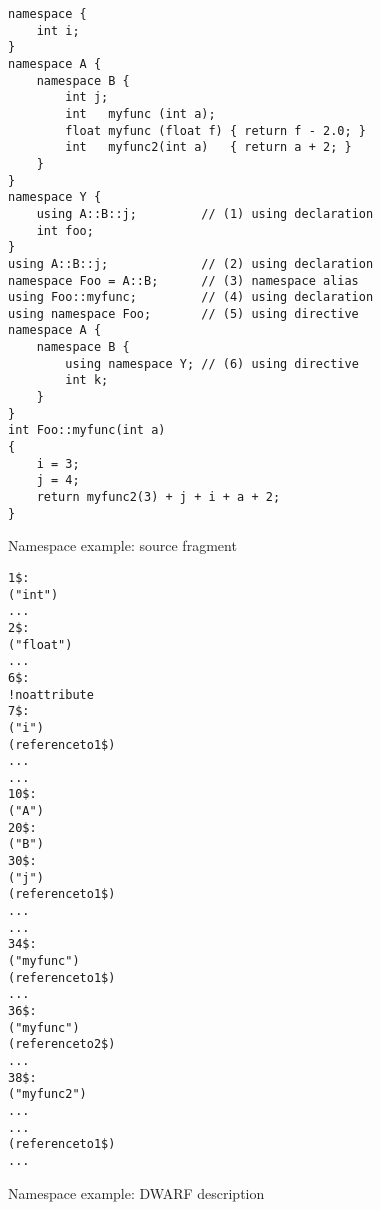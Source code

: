 \begin{figure}[h]
\begin{lstlisting}
namespace {
    int i;
}
namespace A {
    namespace B {
        int j;
        int   myfunc (int a);
        float myfunc (float f) { return f - 2.0; }
        int   myfunc2(int a)   { return a + 2; }
    }
}
namespace Y {
    using A::B::j;         // (1) using declaration
    int foo;
}
using A::B::j;             // (2) using declaration
namespace Foo = A::B;      // (3) namespace alias
using Foo::myfunc;         // (4) using declaration
using namespace Foo;       // (5) using directive
namespace A {
    namespace B {
        using namespace Y; // (6) using directive
        int k;
    }
}
int Foo::myfunc(int a)
{
    i = 3;
    j = 4;
    return myfunc2(3) + j + i + a + 2;
}
\end{lstlisting}
\caption{Namespace example: source fragment}
\label{fig:namespaceexamplesourcefragment}
\end{figure}


\begin{figure}[p]
\begin{dwflisting}
\begin{alltt}

1\$:  \DWTAGbasetype
        \DWATname("int")
        ...
2\$:  \DWTAGbasetype
        \DWATname("float")
        ...
6\$:  \DWTAGnamespace
        ! no \DWATname attribute
7\$:
        \DWTAGvariable
            \DWATname("i")
            \DWATtype(reference to 1\$)
            \DWATlocation ...
            ...
10\$: \DWTAGnamespace
        \DWATname("A")
20\$:    \DWTAGnamespace
            \DWATname("B")
30\$:        \DWTAGvariable
                \DWATname("j")
                \DWATtype(reference to 1\$)
                \DWATlocation ...
                ...
34\$:        \DWTAGsubprogram
                \DWATname("myfunc")
                \DWATtype(reference to 1\$)
                ...
36\$:        \DWTAGsubprogram
                \DWATname("myfunc")
                \DWATtype(reference to 2\$)
                ...
38\$:        \DWTAGsubprogram
                \DWATname("myfunc2")
                \DWATlowpc ...
                \DWAThighpc ...
                \DWATtype(reference to 1\$)
                ...
\end{alltt}
\end{dwflisting}
\caption{Namespace example: DWARF description}
\label{fig:namespaceexampledwarfdescription}
\end{figure}

